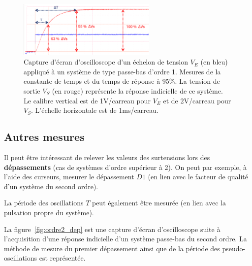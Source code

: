 \begin{figure}[h!]
    \centering
	\includegraphics[width=0.6\textwidth]{images/ri_ordre1_out_63.png}
	
	
	    \caption{Capture d'écran d'oscilloscope d'un échelon de tension $V_E$ (en bleu) appliqué à un système de type passe-bas d'ordre 1. Mesures de la constante de temps et du temps de réponse à 95\%. La tension de sortie $V_S$ (en rouge) représente la réponse indicielle de ce système. Le calibre vertical est de 1V/carreau pour $V_E$ et de 2V/carreau pour $V_S$. L'échelle horizontale est de 1ms/carreau.}
    \label{fig:ordre1_response}
\end{figure}

\newpage
\subsection{Autres mesures}

Il peut être intéressant de relever les valeurs des surtensions lors des \textbf{dépassements} (cas de systèmes d'ordre supérieur à 2). On peut par exemple, à l'aide des curseurs, mesurer le dépassement $D1$ (en lien avec le facteur de qualité d'un système du second ordre).

La période des oscillations $T$ peut également être mesurée (en lien avec la pulsation propre du système).

\medskip

La figure~\ref{fig:ordre2_dep} est une capture d'écran d'oscilloscope suite à l'acquisition d'une réponse indicielle d'un système passe-bas du second ordre. La méthode de mesure du premier dépassement ainsi que de la période des pseudo-oscillations est représentée.

